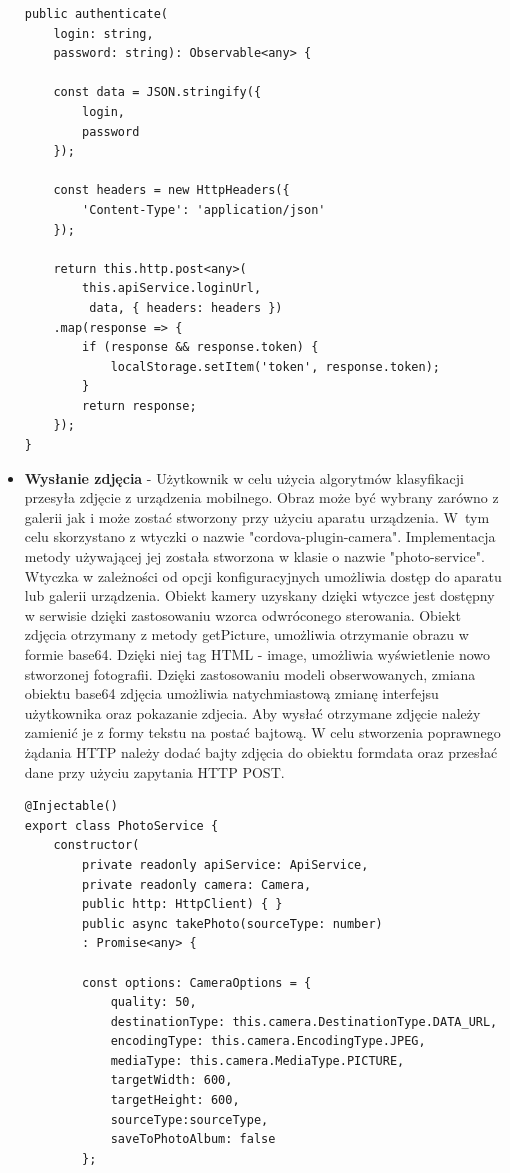 \begin{itemize}
\begin{lstlisting}[caption=Metoda autoryzacji urządzenia mobilnego.]
public authenticate(
	login: string, 
	password: string): Observable<any> {
	
	const data = JSON.stringify({
		login,
		password
	});
	
	const headers = new HttpHeaders({ 
		'Content-Type': 'application/json' 
	});
	
	return this.http.post<any>(
		this.apiService.loginUrl,
		 data, { headers: headers })
	.map(response => {
		if (response && response.token) {
			localStorage.setItem('token', response.token);
		}
		return response;
	});
}
\end{lstlisting} 


\item \textbf{Wysłanie zdjęcia} - Użytkownik w celu użycia algorytmów klasyfikacji przesyła zdjęcie z urządzenia mobilnego. Obraz może być wybrany zarówno z galerii jak i może zostać stworzony przy użyciu aparatu urządzenia. W~tym celu skorzystano z wtyczki o nazwie "cordova-plugin-camera". Implementacja metody używającej jej została stworzona w klasie o nazwie "photo-service". Wtyczka w zależności od opcji konfiguracyjnych umożliwia dostęp do aparatu lub galerii urządzenia. Obiekt kamery uzyskany dzięki wtyczce jest dostępny w serwisie dzięki zastosowaniu wzorca odwróconego sterowania. Obiekt zdjęcia otrzymany z metody getPicture, umożliwia otrzymanie obrazu w formie base64. Dzięki niej tag HTML - image, umożliwia wyświetlenie nowo stworzonej fotografii. Dzięki zastosowaniu modeli obserwowanych, zmiana obiektu base64 zdjęcia umożliwia natychmiastową zmianę interfejsu użytkownika oraz pokazanie zdjecia. Aby wysłać otrzymane zdjęcie należy zamienić je z formy tekstu na postać bajtową. W celu stworzenia poprawnego żądania HTTP należy dodać bajty zdjęcia do obiektu formdata oraz przesłać dane przy użyciu zapytania HTTP POST.



\begin{lstlisting}[caption=Wykorzystanie wtyczki w celu prezentacji zdjecia.]
@Injectable()
export class PhotoService {
	constructor(
		private readonly apiService: ApiService,
		private readonly camera: Camera,
		public http: HttpClient) { }	
		public async takePhoto(sourceType: number)
		: Promise<any> {
	
		const options: CameraOptions = {
			quality: 50,
			destinationType: this.camera.DestinationType.DATA_URL,
			encodingType: this.camera.EncodingType.JPEG,
			mediaType: this.camera.MediaType.PICTURE,
			targetWidth: 600,
			targetHeight: 600,
			sourceType:sourceType,
			saveToPhotoAlbum: false
		};		
		

\end{lstlisting}
\end{itemize}
